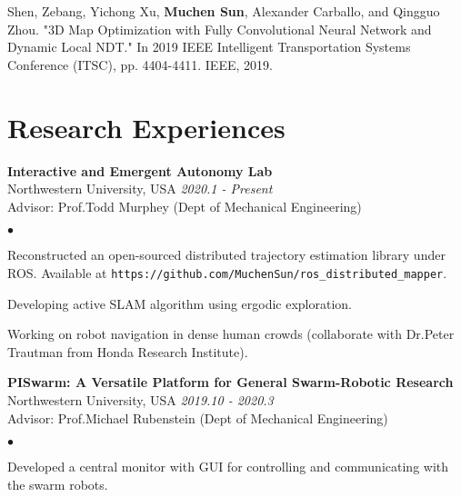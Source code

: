 \documentclass[margin,line,pifont,palatino,courier]{res}
\newenvironment{list2}{
	\begin{list}{$\bullet$}{%
			\setlength{\itemsep}{0in}
			\setlength{\parsep}{0in} \setlength{\parskip}{0in}
			\setlength{\topsep}{0in} \setlength{\partopsep}{0in}
			\setlength{\leftmargin}{0.2in}}}{\end{list}}
\begin{document}
\begin{resume}
		\begin{enumerate}[{[1]}]
			\item Shen, Zebang, Yichong Xu, {\bf Muchen Sun}, Alexander Carballo, and Qingguo Zhou. "3D Map Optimization with Fully Convolutional Neural Network and Dynamic Local NDT." In 2019 IEEE Intelligent Transportation Systems Conference (ITSC), pp. 4404-4411. IEEE, 2019.
		\end{enumerate}
	
		\section{\sc Research Experiences}
		
		{\bf Interactive and Emergent Autonomy Lab} \\
		Northwestern University, USA \hfill {\sl 2020.1 - Present} \\
		Advisor: Prof.Todd Murphey (Dept of Mechanical Engineering)
		\begin{list2}
			\item Reconstructed an open-sourced distributed trajectory estimation library under ROS. Available at \verb+https://github.com/MuchenSun/ros_distributed_mapper+.
			\item Developing active SLAM algorithm using ergodic exploration.
			\item Working on robot navigation in dense human crowds (collaborate with Dr.Peter Trautman from Honda Research Institute).
		\end{list2}
		
		{\bf PISwarm: A Versatile Platform for General Swarm-Robotic Research}\\
		Northwestern University, USA \hfill {\sl 2019.10 - 2020.3} \\
		Advisor: Prof.Michael Rubenstein (Dept of Mechanical Engineering)
		\begin{list2}
			\item Developed a central monitor with GUI for controlling and communicating with the swarm robots.
		\end{list2}
		
		

\end{resume}
\end{document}
